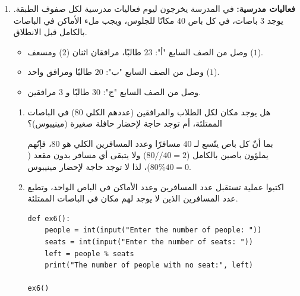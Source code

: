 \documentclass[14pt]{extarticle}
\begin{document}
\begin{enumerate}[label=\textbf{تمرين \arabic*:}, wide=0pt, itemsep=2.2em]
\begin{boxSolution}
\begin{english}
\begin{verbatim}
ex5()
\end{verbatim}
\end{english}
\end{boxSolution}
\fi
\filbreak

\item \textbf{فعاليات مدرسية:} في المدرسة يخرجون ليوم فعاليات مدرسية لكل صفوف الطبقة. يوجد $3$ باصات، في كل باص $40$ مكانًا للجلوس، ويجب ملء الأماكن في الباصات بالكامل قبل الانطلاق.
\begin{itemize}
\item وصل من الصف السابع "أ": $23$ طالبًا، مرافقان اثنان ($2$) ومسعف ($1$).
\item وصل من الصف السابع "ب": $20$ طالبًا ومرافق واحد ($1$).
\item وصل من الصف السابع "ج": $30$ طالبًا و $3$ مرافقين.
\end{itemize}

\begin{enumerate}[label=\alph*.]
\item هل يوجد مكان لكل الطلاب والمرافقين (عددهم الكلي $80$) في الباصات الممتلئة، أم توجد حاجة لإحضار حافلة صغيرة (مينيبوس)؟
\ifwithsols
\begin{boxSolution}
بما أنّ كل باص يتّسع لـ $40$ مسافرًا وعدد المسافرين الكلي هو $80$، فإنّهم يملؤون باصين بالكامل ($80 // 40 = 2$) ولا يتبقى أي مسافر بدون مقعد ($80 \% 40 = 0$)، لذا لا توجد حاجة لإحضار مينيبوس.
\end{boxSolution}
\fi
\filbreak

\item اكتبوا عملية تستقبل عدد المسافرين وعدد الأماكن في الباص الواحد، وتطبع عدد المسافرين الذين لا يوجد لهم مكان في الباصات الممتلئة.
\ifwithsols
\begin{boxSolution}
\begin{english}
\begin{verbatim}
def ex6():
    people = int(input("Enter the number of people: "))
    seats = int(input("Enter the number of seats: "))
    left = people % seats
    print("The number of people with no seat:", left)

ex6()
\end{verbatim}
\end{english}
\end{boxSolution}
\fi
\filbreak
\end{enumerate}
\filbreak

\end{enumerate}

\clearpage
\end{document}
